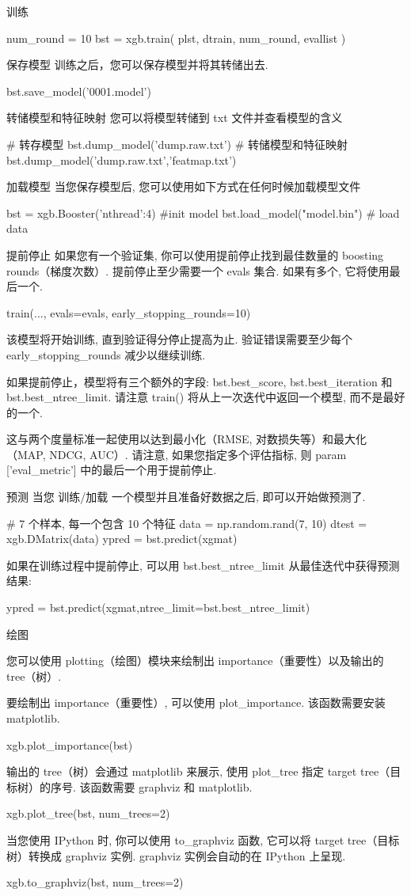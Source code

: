 \documentclass{article}
\newenvironment{python}{\VerbatimEnvironment\begin{pythoncode}}{\end{pythoncode}}
\begin{document}
训练
\begin{python}
num_round = 10
bst = xgb.train( plst, dtrain, num_round, evallist )
\end{python}
保存模型 训练之后，您可以保存模型并将其转储出去.
\begin{python}
bst.save_model('0001.model')
\end{python}
转储模型和特征映射 您可以将模型转储到 txt 文件并查看模型的含义
\begin{python}
# 转存模型
bst.dump_model('dump.raw.txt')
# 转储模型和特征映射
bst.dump_model('dump.raw.txt','featmap.txt')
\end{python}
加载模型 当您保存模型后, 您可以使用如下方式在任何时候加载模型文件
\begin{python}
bst = xgb.Booster({'nthread':4}) #init model
bst.load_model("model.bin") # load data
\end{python}
提前停止
如果您有一个验证集, 你可以使用提前停止找到最佳数量的 boosting rounds（梯度次数）. 提前停止至少需要一个 evals 集合. 如果有多个, 它将使用最后一个.
\begin{python}
train(..., evals=evals, early_stopping_rounds=10)
\end{python}
该模型将开始训练, 直到验证得分停止提高为止. 验证错误需要至少每个 early\_stopping\_rounds 减少以继续训练.

如果提前停止，模型将有三个额外的字段: bst.best\_score, bst.best\_iteration 和 bst.best\_ntree\_limit. 请注意 train() 将从上一次迭代中返回一个模型, 而不是最好的一个.

这与两个度量标准一起使用以达到最小化（RMSE, 对数损失等）和最大化（MAP, NDCG, AUC）. 请注意, 如果您指定多个评估指标, 则 param ['eval\_metric'] 中的最后一个用于提前停止.

预测
当您 训练/加载 一个模型并且准备好数据之后, 即可以开始做预测了.
\begin{python}
# 7 个样本, 每一个包含 10 个特征
data = np.random.rand(7, 10)
dtest = xgb.DMatrix(data)
ypred = bst.predict(xgmat)
\end{python}
如果在训练过程中提前停止, 可以用 bst.best\_ntree\_limit 从最佳迭代中获得预测结果:
\begin{python}
ypred = bst.predict(xgmat,ntree_limit=bst.best_ntree_limit)
\end{python}
绘图

您可以使用 plotting（绘图）模块来绘制出 importance（重要性）以及输出的 tree（树）.

要绘制出 importance（重要性）, 可以使用 plot\_importance. 该函数需要安装 matplotlib.
\begin{python}
xgb.plot_importance(bst)
\end{python}
输出的 tree（树）会通过 matplotlib 来展示, 使用 plot\_tree 指定 target tree（目标树）的序号. 该函数需要 graphviz 和 matplotlib.
\begin{python}
xgb.plot_tree(bst, num_trees=2)
\end{python}
当您使用 IPython 时, 你可以使用 to\_graphviz 函数, 它可以将 target tree（目标树）转换成 graphviz 实例. graphviz 实例会自动的在 IPython 上呈现.
\begin{python}
xgb.to_graphviz(bst, num_trees=2)
\end{python}
\end{document}
